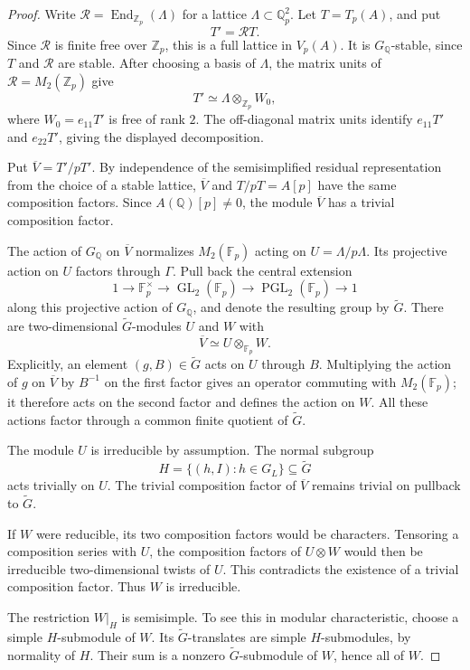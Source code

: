 \documentclass[11pt]{article}
\newcommand{\Q}{\mathbb Q}
\newcommand{\Z}{\mathbb Z}
\newcommand{\F}{\mathbb F}
\DeclareMathOperator{\End}{End}
\DeclareMathOperator{\GL}{GL}
\DeclareMathOperator{\PGL}{PGL}
\begin{document}
\begin{proof}
Write \(\mathcal R=\End_{\Z_p}(\Lambda)\) for a lattice
\(\Lambda\subset\Q_p^2\). Let \(T=T_p(A)\), and put
\[
 T'=\mathcal R T.
\]
Since \(\mathcal R\) is finite free over \(\Z_p\), this is a full
lattice in \(V_p(A)\). It is \(G_{\Q}\)-stable, since \(T\) and
\(\mathcal R\) are stable. After choosing a basis of \(\Lambda\),
the matrix units of \(\mathcal R=M_2(\Z_p)\) give
\[
 T'\simeq\Lambda\otimes_{\Z_p}W_0,
\]
where \(W_0=e_{11}T'\) is free of rank \(2\). The off-diagonal
matrix units identify \(e_{11}T'\) and \(e_{22}T'\), giving the
displayed decomposition.

Put \(\overline V=T'/pT'\). By independence of the semisimplified
residual representation from the choice of a stable lattice,
\(\overline V\) and \(T/pT=A[p]\) have the same composition
factors. Since \(A(\Q)[p]\neq0\), the module \(\overline V\) has a
trivial composition factor.

The action of \(G_{\Q}\) on \(\overline V\) normalizes
\(M_2(\F_p)\) acting on \(U=\Lambda/p\Lambda\). Its projective
action on \(U\) factors through \(\Gamma\). Pull back the central
extension
\[
 1\longrightarrow\F_p^\times\longrightarrow\GL_2(\F_p)
 \longrightarrow\PGL_2(\F_p)\longrightarrow1
\]
along this projective action of \(G_{\Q}\), and denote the
resulting group by \(\widetilde G\).
There are two-dimensional \(\widetilde G\)-modules \(U\) and \(W\)
with
\[
 \overline V\simeq U\otimes_{\F_p}W.
\]
Explicitly, an element \((g,B)\in\widetilde G\) acts on \(U\)
through \(B\). Multiplying the action of \(g\) on \(\overline V\)
by \(B^{-1}\) on the first factor gives an operator commuting
with \(M_2(\F_p)\); it therefore acts on the second factor and
defines the action on \(W\). All these actions factor through a
common finite quotient of \(\widetilde G\).

The module \(U\) is irreducible by assumption. The normal subgroup
\[
 H=\{(h,I):h\in G_L\}\subseteq\widetilde G
\]
acts trivially on \(U\). The trivial composition factor of
\(\overline V\) remains trivial on pullback to \(\widetilde G\).

If \(W\) were reducible, its two composition factors would be
characters. Tensoring a composition series with \(U\), the
composition factors of \(U\otimes W\) would then be irreducible
two-dimensional twists of \(U\). This contradicts the existence
of a trivial composition factor. Thus \(W\) is irreducible.

The restriction \(W|_H\) is semisimple. To see this in modular
characteristic, choose a simple \(H\)-submodule of \(W\). Its
\(\widetilde G\)-translates are simple \(H\)-submodules, by
normality of \(H\). Their sum is a nonzero
\(\widetilde G\)-submodule of \(W\), hence all of \(W\).


\end{proof}
\end{document}
